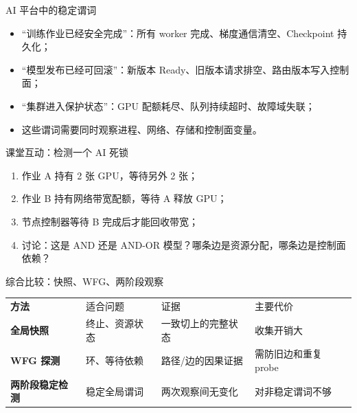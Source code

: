 \documentclass[UTF8,fontset=none,aspectratio=169,10pt]{beamer}
\begin{document}
\begin{frame}{AI 平台中的稳定谓词}
\begin{itemize}
  \item “训练作业已经安全完成”：所有 worker 完成、梯度通信清空、Checkpoint 持久化；
  \item “模型发布已经可回滚”：新版本 Ready、旧版本请求排空、路由版本写入控制面；
  \item “集群进入保护状态”：GPU 配额耗尽、队列持续超时、故障域失联；
  \item 这些谓词需要同时观察进程、网络、存储和控制面变量。
\end{itemize}
\end{frame}

\begin{frame}{课堂互动：检测一个 AI 死锁}
\begin{enumerate}
  \item 作业 A 持有 2 张 GPU，等待另外 2 张；
  \item 作业 B 持有网络带宽配额，等待 A 释放 GPU；
  \item 节点控制器等待 B 完成后才能回收带宽；
  \item 讨论：这是 AND 还是 AND-OR 模型？哪条边是资源分配，哪条边是控制面依赖？
\end{enumerate}
\vfill
{}
\end{frame}

\begin{frame}{综合比较：快照、WFG、两阶段观察}
\begin{tabularx}{\linewidth}{>{\bfseries}p{2.8cm}XXX}
\toprule
方法 & 适合问题 & 证据 & 主要代价 \\
全局快照 & 终止、资源状态 & 一致切上的完整状态 & 收集开销大 \\
WFG 探测 & 环、等待依赖 & 路径/边的因果证据 & 需防旧边和重复 probe \\
两阶段稳定检测 & 稳定全局谓词 & 两次观察间无变化 & 对非稳定谓词不够 \\
\bottomrule
\end{tabularx}
\end{frame}

\end{document}
